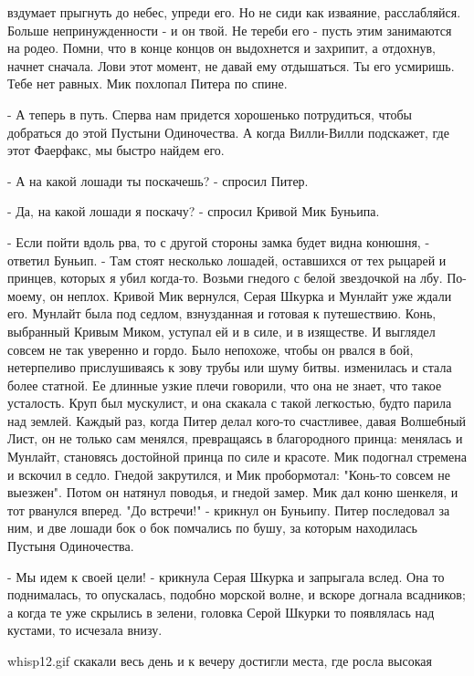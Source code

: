 вздумает прыгнуть до небес, упреди его. Но не сиди как изваяние, 
расслабляйся. Больше непринужденности - и он твой. Не тереби его - 
пусть этим занимаются на родео. Помни, что в конце концов он 
выдохнется и захрипит, а отдохнув, начнет сначала. Лови этот момент, 
не давай ему отдышаться. Ты его усмиришь. Тебе нет равных.
 Мик похлопал Питера по спине.
\par- А теперь в путь. Сперва нам придется хорошенько потрудиться, 
чтобы добраться до этой Пустыни Одиночества. А когда Вилли-Вилли 
подскажет, где этот Фаерфакс, мы быстро найдем его.
\par- А на какой лошади ты поскачешь? - спросил Питер.
\par- Да, на какой лошади я поскачу? - спросил Кривой Мик Буньипа.
\par- Если пойти вдоль рва, то с другой стороны замка будет видна 
конюшня, - ответил Буньип. - Там стоят несколько лошадей, оставшихся 
от тех рыцарей и принцев, которых я убил когда-то. Возьми гнедого с 
белой звездочкой на лбу. По-моему, он неплох.
 Кривой Мик вернулся, Серая Шкурка и Мунлайт уже ждали его. 
Мунлайт была под седлом, взнузданная и готовая к путешествию. Конь, 
выбранный Кривым Миком, уступал ей и в силе, и в изяществе. И выглядел 
совсем не так уверенно и гордо. Было непохоже, чтобы он рвался в бой, 
нетерпеливо прислушиваясь к зову трубы или шуму битвы.
 изменилась и стала более статной. Ее длинные узкие плечи 
говорили, что она не знает, что такое усталость. Круп был мускулист, и 
она скакала с такой легкостью, будто парила над землей. Каждый раз, 
когда Питер делал кого-то счастливее, давая Волшебный Лист, он не 
только сам менялся, превращаясь в благородного принца: менялась и 
Мунлайт, становясь достойной принца по силе и красоте.
 Мик подогнал стремена и вскочил в седло. Гнедой закрутился, 
и Мик пробормотал: "Конь-то совсем не выезжен". Потом он натянул 
поводья, и гнедой замер.
 Мик дал коню шенкеля, и тот рванулся вперед. "До встречи!" 
- крикнул он Буньипу. Питер последовал за ним, и две лошади бок о бок 
помчались по бушу, за которым находилась Пустыня Одиночества.
\par- Мы идем к своей цели! - крикнула Серая Шкурка и запрыгала вслед. 
Она то поднималась, то опускалась, подобно морской волне, и вскоре 
догнала всадников; а когда те уже скрылись в зелени, головка Серой 
Шкурки то появлялась над кустами, то исчезала внизу.
\par{whisp12.gif}
 скакали весь день и к вечеру достигли места, где росла высокая 

